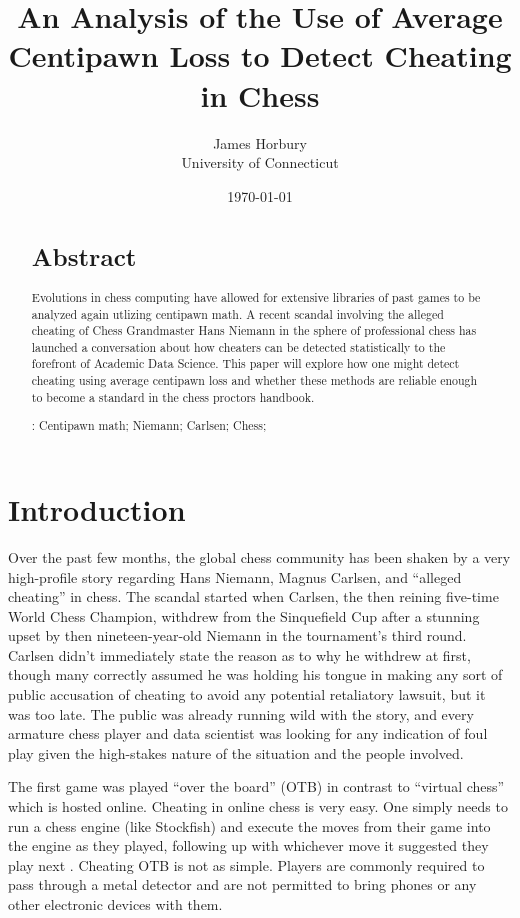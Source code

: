 \documentclass[12pt, letterpaper, titlepage]{article}
\title{An Analysis of the Use of Average Centipawn Loss to Detect Cheating in Chess}
\author{James Horbury\\
    University of Connecticut
}
\date{\today}
\begin{document}
\maketitle

\begin{abstract}
\section*{Abstract}
\label{sec:abs}

Evolutions in chess computing have allowed for extensive libraries of past games to be analyzed again utlizing centipawn math. A recent scandal involving the alleged cheating of Chess Grandmaster Hans Niemann in the sphere of professional chess has launched a conversation about how cheaters can be detected statistically to the forefront of Academic Data Science. This paper will explore how one might detect cheating using average centipawn loss and whether these methods are reliable enough to become a standard in the chess proctors handbook.

\bigskip
\noindent{}:
Centipawn math; 
Niemann;
Carlsen;
Chess;
\end{abstract}

\section*{Introduction}
\label{sec:intro}

Over the past few months, the global chess community has been shaken by a very high-profile story regarding Hans Niemann, Magnus Carlsen, and “alleged cheating” in chess. The scandal started when Carlsen, the then reining five-time World Chess Champion, withdrew from the Sinquefield Cup after a stunning upset by then nineteen-year-old Niemann in the tournament’s third round. Carlsen didn’t immediately state the reason as to why he withdrew at first, though many correctly assumed he was holding his tongue in making any sort of public accusation of cheating to avoid any potential retaliatory lawsuit, but it was too late. The public was already running wild with the story, and every armature chess player and data scientist was looking for any indication of foul play given the high-stakes nature of the situation and the people involved.

The first game was played “over the board” (OTB) in contrast to “virtual chess” which is hosted online. Cheating in online chess is very easy. One simply needs to run a chess engine (like Stockfish) and execute the moves from their game into the engine as they played, following up with whichever move it suggested they play next \citep{kenregan2010}. Cheating OTB is not as simple. Players are commonly required to pass through a metal detector and are not permitted to bring phones or any other electronic devices with them.
\end{document}
